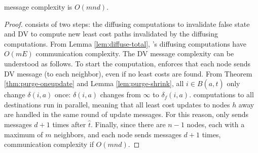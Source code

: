 {{\begin{theorem}
\label{thm:purge-msg-complexity}
\purge message complexity is $O(mnd)$.
\end{theorem}
\begin{proof}
\purge consists of two steps: the diffusing computations to invalidate false state and DV to compute new least cost paths invalidated by the diffusing computations.
From Lemma \ref{lem:diffuse-total}, \purges's diffusing computations have $O(mE)$ communication complexity.  The DV message complexity can be understood as follows.
To start the computation, \purge enforces that each node sends DV message (to each neighbor), even if no least costs are found. 
From Theorem \ref{thm:purge-oneupdate} and Lemma \ref{lem:purge-shrink}, all $i \in B(a,\hat{t})$ only change $\delta(i,a)$ once: $\delta(i,a)$ changes
from $\infty$ to $\delta_f(i,a)$.  %
\purge computations to all destinations run in parallel, meaning that all least cost updates to nodes $h$ away are handled in the same round of update messages. For this reason,
\purge only sends messages $d+1$ times after $\hat{t}$.  Finally,
since there are $n-1$ nodes, each with a maximum of $m$ neighbors, and each node sends messages $d+1$ times, \purge communication complexity if $O(mnd)$.
\end{proof}



}}
